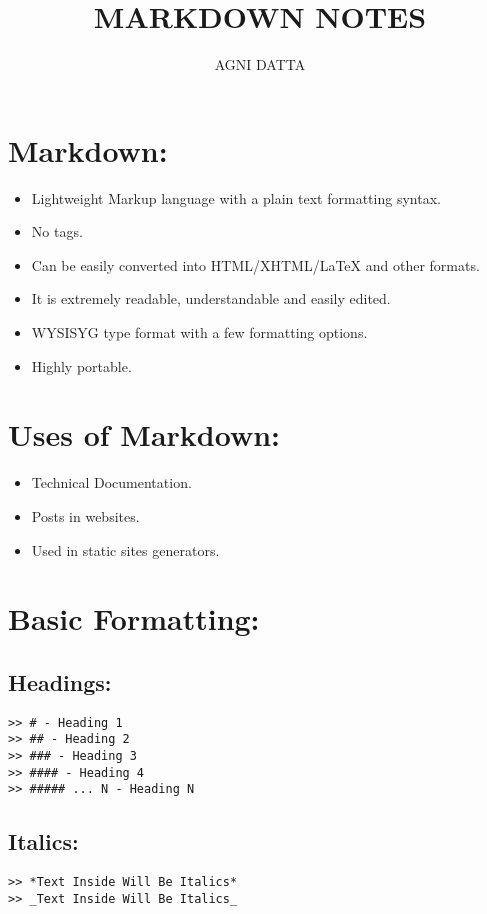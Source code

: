 \documentclass[british]{article}
\begin{document}
\title{\textbf{MARKDOWN NOTES}}
\author{AGNI DATTA}

\maketitle
\tableofcontents{}

\pagebreak{}

\section{Markdown:}
\begin{itemize}
\item Lightweight Markup language with a plain text formatting syntax.
\item No tags. 
\item Can be easily converted into HTML/XHTML/\LaTeX\: and other formats.
\item It is extremely readable, understandable and easily edited.
\item WYSISYG type format with a few formatting options.
\item Highly portable.
\end{itemize}

\section{Uses of Markdown:}
\begin{itemize}
\item Technical Documentation.
\item Posts in websites.
\item Used in static sites generators.
\end{itemize}

\section{Basic Formatting:}

\subsection{Headings:}
\begin{verbatim}
>> # - Heading 1
>> ## - Heading 2
>> ### - Heading 3
>> #### - Heading 4
>> ##### ... N - Heading N
\end{verbatim}

\subsection{Italics:}
\begin{verbatim}
>> *Text Inside Will Be Italics*
>> _Text Inside Will Be Italics_
\end{verbatim}
\end{document}
